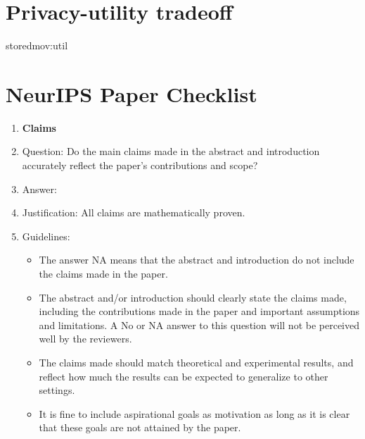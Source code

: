 \documentclass{article}
\newif\ifconferencemode
\newcommand{\showstored}[1]{\csname stored#1\endcsname}
\newif\ifconferencemode
\newcommand{\NeurIPS}[1]{#1}
\newcommand{\NeurIPS}[1]{}
\theoremstyle{plain}
\theoremstyle{definition}
\begin{document}
\NeurIPS{\section{Privacy-utility tradeoff}\label{apd:util}}
\showstored{mov:util}

\ifconferencemode
\newpage
\section*{NeurIPS Paper Checklist}
\begin{enumerate}

\item {\bf Claims}
    \item[] Question: Do the main claims made in the abstract and introduction accurately reflect the paper's contributions and scope?
    \item[] Answer: \answerYes{}
    \item[] Justification: All claims are mathematically proven.
    \item[] Guidelines:
    \begin{itemize}
        \item The answer NA means that the abstract and introduction do not include the claims made in the paper.
        \item The abstract and/or introduction should clearly state the claims made, including the contributions made in the paper and important assumptions and limitations. A No or NA answer to this question will not be perceived well by the reviewers. 
        \item The claims made should match theoretical and experimental results, and reflect how much the results can be expected to generalize to other settings. 
        \item It is fine to include aspirational goals as motivation as long as it is clear that these goals are not attained by the paper. 
    \end{itemize}


\end{enumerate}
\end{document}
